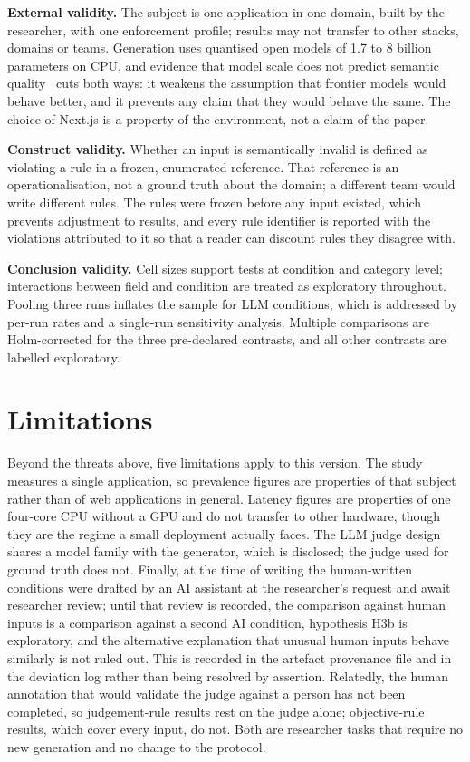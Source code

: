 \documentclass[conference]{IEEEtran}
\begin{document}
\textbf{External validity.} The subject is one application in one domain, built by the researcher,
with one enforcement profile; results may not transfer to other stacks, domains or teams. Generation
uses quantised open models of 1.7 to 8 billion parameters on CPU, and evidence that model scale does
not predict semantic quality~\cite{singh2026sob,wrenn2026enterprise} cuts both ways: it weakens the
assumption that frontier models would behave better, and it prevents any claim that they would behave
the same. The choice of Next.js is a property of the environment, not a claim of the paper.

\textbf{Construct validity.} Whether an input is semantically invalid is defined as violating a rule
in a frozen, enumerated reference. That reference is an operationalisation, not a ground truth about
the domain; a different team would write different rules. The rules were frozen before any input
existed, which prevents adjustment to results, and every rule identifier is reported with the
violations attributed to it so that a reader can discount rules they disagree with.

\textbf{Conclusion validity.} Cell sizes support tests at condition and category level; interactions
between field and condition are treated as exploratory throughout. Pooling three runs inflates the
sample for LLM conditions, which is addressed by per-run rates and a single-run sensitivity analysis.
Multiple comparisons are Holm-corrected for the three pre-declared contrasts, and all other
contrasts are labelled exploratory.

\section{Limitations}
\label{sec:limitations}

Beyond the threats above, five limitations apply to this version. The study measures a
single application, so prevalence figures are properties of that subject rather than of web
applications in general. Latency figures are properties of one four-core CPU without a GPU and do not
transfer to other hardware, though they are the regime a small deployment actually faces. The LLM
judge design shares a model family with the generator, which is disclosed; the judge used for ground
truth does not. Finally, at the time of writing the human-written conditions were drafted by an AI
assistant at the researcher's request and await researcher review; until that review is recorded, the
comparison against human inputs is a comparison against a second AI condition, hypothesis H3b is
exploratory, and the alternative explanation that unusual human inputs behave similarly is not ruled
out. This is recorded in the artefact provenance file and in the deviation log rather than being
resolved by assertion. Relatedly, the human annotation that would validate the judge against a person
has not been completed, so judgement-rule results rest on the judge alone; objective-rule results,
which cover every input, do not. Both are researcher tasks that require no new generation and no
change to the protocol.
\end{document}
